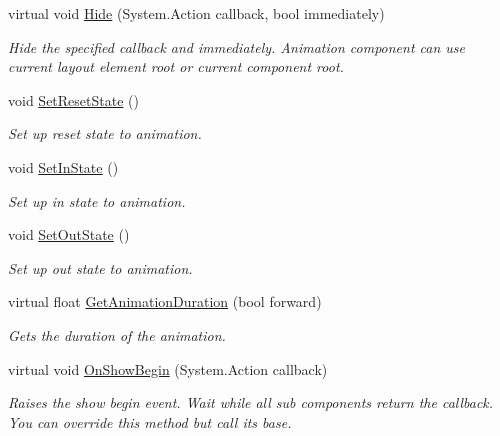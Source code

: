 \begin{DoxyCompactItemize}
virtual void \hyperlink{class_unity_engine_1_1_u_i_1_1_windows_1_1_window_component_base_a93d7acfca00ae68888db47b83d63bb7d}{Hide} (System.\+Action callback, bool immediately)
\begin{DoxyCompactList}\small\item\em Hide the specified callback and immediately. Animation component can use current layout element root or current component root. \end{DoxyCompactList}\item 
void \hyperlink{class_unity_engine_1_1_u_i_1_1_windows_1_1_window_component_base_a0d98ef7654b23c3c86d6e1201607090c}{Set\+Reset\+State} ()
\begin{DoxyCompactList}\small\item\em Set up {\ttfamily reset} state to animation. \end{DoxyCompactList}\item 
void \hyperlink{class_unity_engine_1_1_u_i_1_1_windows_1_1_window_component_base_a28395cfba5ca1276ce2f97efb3643058}{Set\+In\+State} ()
\begin{DoxyCompactList}\small\item\em Set up {\ttfamily in} state to animation. \end{DoxyCompactList}\item 
void \hyperlink{class_unity_engine_1_1_u_i_1_1_windows_1_1_window_component_base_a9a981607d549f8a89e3ba61e9f41f909}{Set\+Out\+State} ()
\begin{DoxyCompactList}\small\item\em Set up {\ttfamily out} state to animation. \end{DoxyCompactList}\item 
virtual float \hyperlink{class_unity_engine_1_1_u_i_1_1_windows_1_1_window_component_base_a87f4e991dc86c677330ae8cc058bbac4}{Get\+Animation\+Duration} (bool forward)
\begin{DoxyCompactList}\small\item\em Gets the duration of the animation. \end{DoxyCompactList}\item 
virtual void \hyperlink{class_unity_engine_1_1_u_i_1_1_windows_1_1_window_component_base_ae63f5d36266e22077b383f1264767afe}{On\+Show\+Begin} (System.\+Action callback)
\begin{DoxyCompactList}\small\item\em Raises the show begin event. Wait while all sub components return the callback. You can override this method but call it\textquotesingle{}s base. \end{DoxyCompactList}\item 

\end{DoxyCompactItemize}
